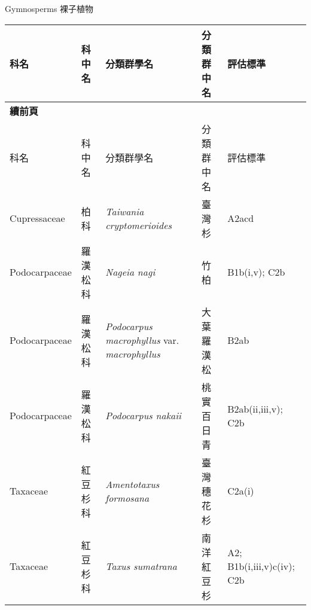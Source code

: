 \noindent\normalfont\selectfont Gymnosperms 裸子植物
\footnotesize\selectfont
        {\def\arraystretch{1.5}\tabcolsep=2pt
        \begin{longtable}{p{2.5cm}p{2.5cm}p{4.5cm}p{2.5cm}p{3cm}}
        \toprule
          科名 & 科中名 & 分類群學名 & 分類群中名 & 評估標準 \\
        \midrule 
        \endfirsthead

        {{\bfseries 續前頁 }} \\
        科名 & 科中名 & 分類群學名 & 分類群中名 & 評估標準 \\
        \midrule
        \endhead
                Cupressaceae & 柏科 & \textit{Taiwania cryptomerioides}  & 臺灣杉 & A2acd \index{Taiwania@\textit{Taiwania}!cryptomerioides@\textit{cryptomerioides}}  \index{臺灣杉} \\
    Podocarpaceae & 羅漢松科 & \textit{Nageia nagi}  & 竹柏 & B1b(i,v); C2b \index{Nageia@\textit{Nageia}!nagi@\textit{nagi}}  \index{竹柏} \\
    Podocarpaceae & 羅漢松科 & \textit{Podocarpus macrophyllus} var. \textit{macrophyllus}  & 大葉羅漢松 & B2ab \index{Podocarpus@\textit{Podocarpus}!macrophyllus@\textit{macrophyllus}!var. macrophyllus@var. \textit{macrophyllus}}  \index{大葉羅漢松} \\
    Podocarpaceae & 羅漢松科 & \textit{Podocarpus nakaii}  & 桃實百日青 & B2ab(ii,iii,v); C2b \index{Podocarpus@\textit{Podocarpus}!nakaii@\textit{nakaii}}  \index{桃實百日青} \\
    Taxaceae & 紅豆杉科 & \textit{Amentotaxus formosana}  & 臺灣穗花杉 & C2a(i) \index{Amentotaxus@\textit{Amentotaxus}!formosana@\textit{formosana}}  \index{臺灣穗花杉} \\
    Taxaceae & 紅豆杉科 & \textit{Taxus sumatrana}  & 南洋紅豆杉 & A2; B1b(i,iii,v)c(iv); C2b \index{Taxus@\textit{Taxus}!sumatrana@\textit{sumatrana}}  \index{南洋紅豆杉} \\
    \bottomrule
        \end{longtable}
        }
    